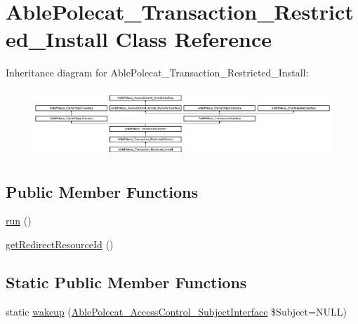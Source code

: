 \hypertarget{class_able_polecat___transaction___restricted___install}{}\section{Able\+Polecat\+\_\+\+Transaction\+\_\+\+Restricted\+\_\+\+Install Class Reference}
\label{class_able_polecat___transaction___restricted___install}
Inheritance diagram for Able\+Polecat\+\_\+\+Transaction\+\_\+\+Restricted\+\_\+\+Install\+:\begin{figure}[H]
\begin{center}
\leavevmode
\includegraphics[height=2.560976cm]{class_able_polecat___transaction___restricted___install}
\end{center}
\end{figure}
\subsection*{Public Member Functions}
\begin{DoxyCompactItemize}
\item 
\hyperlink{class_able_polecat___transaction___restricted___install_afb0fafe7e02a3ae1993c01c19fad2bae}{run} ()
\item 
\hyperlink{class_able_polecat___transaction___restricted___install_abd12d28cbfdd5a45fba85bbac51a0b12}{get\+Redirect\+Resource\+Id} ()
\end{DoxyCompactItemize}
\subsection*{Static Public Member Functions}
\begin{DoxyCompactItemize}
\item 
static \hyperlink{class_able_polecat___transaction___restricted___install_a3f2135f6ad45f51d075657f6d20db2cd}{wakeup} (\hyperlink{interface_able_polecat___access_control___subject_interface}{Able\+Polecat\+\_\+\+Access\+Control\+\_\+\+Subject\+Interface} \$Subject=N\+U\+L\+L)
\end{DoxyCompactItemize}
